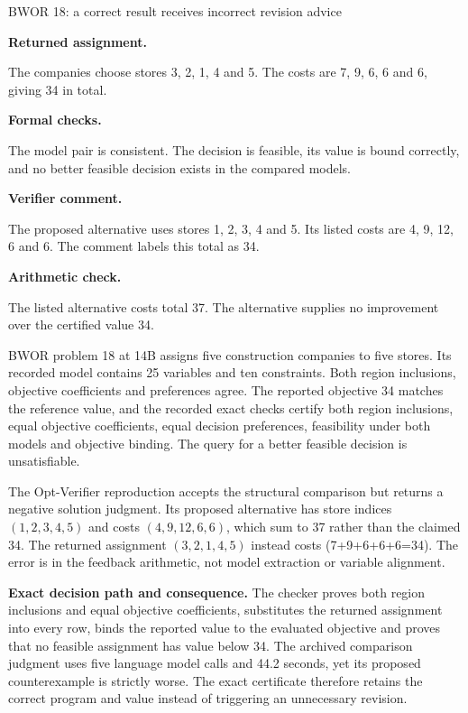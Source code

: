 \begin{evidencecase}{BWOR 18: a correct result receives incorrect revision advice}
\begin{minipage}[t]{0.475\linewidth}\vspace{0pt}\small
\textcolor{verdictgreen}{\textbf{Returned assignment.}}\par
The companies choose stores 3, 2, 1, 4 and 5. The costs are 7, 9, 6, 6 and 6, giving 34 in total.\par\medskip
\textcolor{verdictgreen}{\textbf{Formal checks.}}\par
The model pair is consistent. The decision is feasible, its value is bound correctly, and no
better feasible decision exists in the compared models.
\end{minipage}\hfill
\begin{minipage}[t]{0.475\linewidth}\vspace{0pt}\small
\textcolor{verdictorange}{\textbf{Verifier comment.}}\par
The proposed alternative uses stores 1, 2, 3, 4 and 5. Its listed costs are 4, 9, 12, 6 and 6.
The comment labels this total as 34.\par\medskip
\textcolor{verdictblue}{\textbf{Arithmetic check.}}\par
The listed alternative costs total 37. The alternative supplies no improvement over the certified
value 34.
\end{minipage}
\end{evidencecase}

BWOR problem 18 at 14B assigns five construction companies to five stores. Its recorded model
contains 25 variables and ten constraints. Both region inclusions, objective coefficients and
preferences agree. The reported objective 34 matches the reference value, and the recorded exact
checks certify both region inclusions, equal objective coefficients, equal decision preferences,
feasibility under both models and objective binding. The query for a better feasible decision is
unsatisfiable.

The Opt-Verifier reproduction accepts the structural comparison but returns a negative solution
judgment. Its proposed alternative has store indices \((1,2,3,4,5)\) and costs
\((4,9,12,6,6)\), which sum to 37 rather than the claimed 34. The returned assignment
\((3,2,1,4,5)\) instead costs (7+9+6+6+6=34). The error is in the feedback arithmetic, not
model extraction or variable alignment.

\textbf{Exact decision path and consequence.} The checker proves both region inclusions and equal
objective coefficients, substitutes the returned assignment into every row, binds the reported
value to the evaluated objective and proves that no feasible assignment has value below 34. The
archived comparison judgment uses five language model calls and 44.2 seconds, yet its proposed
counterexample is strictly worse. The exact certificate therefore retains the correct program and
value instead of triggering an unnecessary revision.
